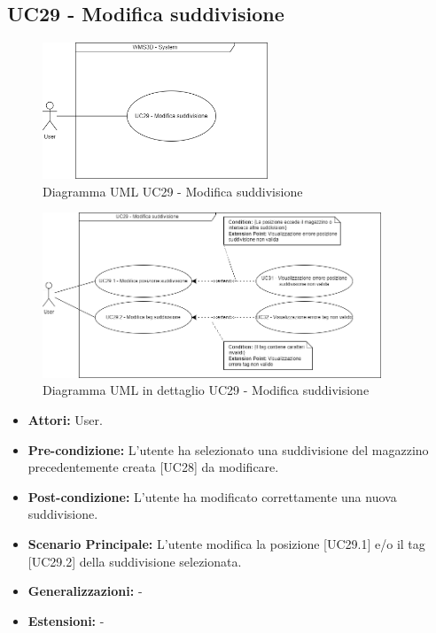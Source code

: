 \subsection{UC29 - Modifica suddivisione}
\begin{figure}[H]
  \centering
  \includegraphics[width=0.6\textwidth]{UC_diagrams_28-32/UC29_sys.drawio.png}
   \caption{Diagramma UML UC29 - Modifica suddivisione}
\end{figure}
\begin{figure}[H]
  \centering
  \includegraphics[width=0.9\textwidth]{UC_diagrams_28-32/UC29.drawio.png}
   \caption{Diagramma UML in dettaglio UC29 - Modifica suddivisione}
\end{figure}
\begin{itemize}
    \item \textbf{Attori:} User.
    \item \textbf{Pre-condizione:} L'utente ha selezionato una suddivisione del magazzino precedentemente creata [UC28] da modificare.
    \item \textbf{Post-condizione:} L'utente ha modificato correttamente una nuova suddivisione.
    \item \textbf{Scenario Principale:} L'utente modifica la posizione [UC29.1] e/o il tag [UC29.2] della suddivisione selezionata.
    \item \textbf{Generalizzazioni:} -
    \item \textbf{Estensioni:} -
\end{itemize}

